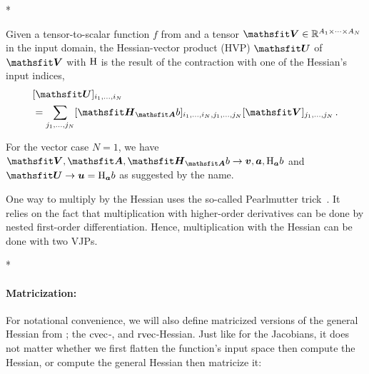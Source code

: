 \switchcolumn[1]*
\switchcolumn[0]

\begin{definition}\label{def:hvp}
  Given a tensor-to-scalar function $f$ from  and a tensor $\tV \in \sR^{A_1 \times \dots \times A_N}$ in the input domain, the Hessian-vector product (HVP) $\tU$ of $\tV$ with $\mathrm{H}$ is the result of the contraction with one of the Hessian's input indices,
  \begin{align*}
     & [\tU]_{i_1, \dots, i_N}
    \\
     & =
    \sum_{j_1, \dots, j_N}
    [\tH_{\tA}b]_{i_1, \dots, i_N, j_1, \dots, j_N} [\tV]_{j_1, \dots, j_N}\,.
  \end{align*}
\end{definition}
For the vector case $N=1$, we have $\tV, \tA, \tH_{\tA}b \to \vv, \va, \hess_{\va}b$ and $\tU \to \vu = \hess_{\va} b$ as suggested by the name.

One way to multiply by the Hessian uses the so-called Pearlmutter trick~\cite{pearlmutter1994fast}.
It relies on the fact that multiplication with higher-order derivatives can be done by nested first-order differentiation.
Hence, multiplication with the Hessian can be done with two VJPs.

\switchcolumn[1]*
\switchcolumn[0]

\paragraph{Matricization:} For notational convenience, we will also define matricized versions of the general Hessian from ; the $\operatorname{cvec}$-, and $\operatorname{rvec}$-Hessian. Just like for the Jacobians, it does not matter whether we first flatten the function's input space then compute the Hessian, or compute the general Hessian then matricize it:

